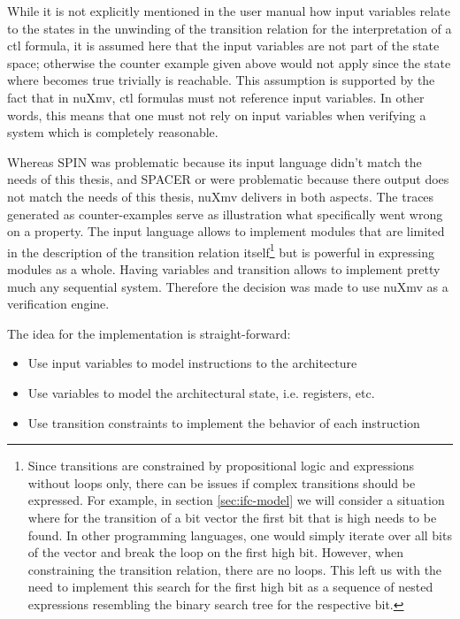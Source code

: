 \begin{example}
    While it is not explicitly mentioned in the user manual how input variables relate to the states in the unwinding of the transition relation for the interpretation of a \gls{ctl} formula, it is assumed here that the input variables are not part of the state space; otherwise the counter example given above would not apply since the state where  becomes true trivially is reachable.
    This assumption is supported by the fact that in nuXmv, \gls{ctl} formulas must not reference input variables.
    In other words, this means that one must not rely on input variables when verifying a system which is completely reasonable.
\end{example}

Whereas SPIN was problematic because its input language didn't match the needs of this thesis, and SPACER or \muZ{} were problematic because there output does not match the needs of this thesis, nuXmv delivers in both aspects.
The traces generated as counter-examples serve as illustration what specifically went wrong on a property.
The input language allows to implement modules that are limited in the description of the transition relation itself\footnote{%
    Since transitions are constrained by propositional logic and expressions without loops only, there can be issues if complex transitions should be expressed.
    For example, in section \ref{sec:ifc-model} we will consider a situation where for the transition of a bit vector the first bit that is high needs to be found.
    In other programming languages, one would simply iterate over all bits of the vector and break the loop on the first high bit.
    However, when constraining the transition relation, there are no loops.
    This left us with the need to implement this search for the first high bit as a sequence of nested  expressions resembling the binary search tree for the respective bit.
} but is powerful in expressing modules as a whole.
Having variables and transition allows to implement pretty much any sequential system.
Therefore the decision was made to use nuXmv as a verification engine.

The idea for the implementation is straight-forward:
\begin{itemize}
    \item Use input variables to model instructions to the architecture
    \item Use variables to model the architectural state, i.e. registers, etc.
    \item Use transition constraints to implement the behavior of each instruction
\end{itemize}

